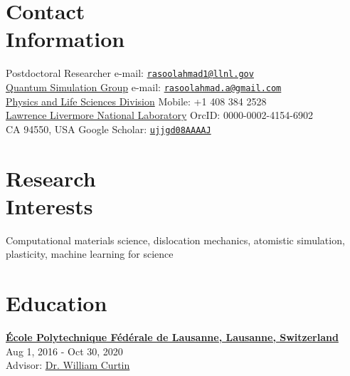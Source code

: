 \documentclass[margin,line]{resume}
\begin{document}
\renewcommand{\thefootnote}{\fnsymbol{footnote}}
\begin{resume}

    \section{\mysidestyle Contact\\Information}
    Postdoctoral Researcher \hfill e-mail: {\href{mailto:rasoolahmad1@llnl.gov}{\nolinkurl{rasoolahmad1@llnl.gov}}} \\
    \href{https://qsg.llnl.gov}{Quantum Simulation Group} \hfill e-mail: {\href{mailto:rasoolahmad.a@gmail.com}{\nolinkurl{rasoolahmad.a@gmail.com}}} \\
    \href{https://pls.llnl.gov}{Physics and Life Sciences Division} \hfill Mobile: +1 408 384 2528 \\
    \href{https://llnl.gov}{Lawrence Livermore National Laboratory} \hfill OrcID:  0000-0002-4154-6902 \\
    CA 94550, USA  \hfill Google Scholar: {\href{https://scholar.google.ch/citations?user=ujjgd08AAAAJ&hl=en}{\nolinkurl{ujjgd08AAAAJ}}}




    \section{\mysidestyle Research\\Interests}

    Computational materials science, dislocation mechanics, atomistic simulation, plasticity, machine learning for science

    \section{\mysidestyle Education}

    \textbf{\href{https://www.epfl.ch/en/}{\textsf{\'Ecole Polytechnique F\'ed\'erale de Lausanne, Lausanne,
                Switzerland} }} \\
     \hfill \small{Aug 1, 2016 - Oct 30, 2020} \\
    Advisor:  \href{https://people.epfl.ch//william.curtin?lang=en}{Dr. William Curtin}


\end{resume}
\end{document}

